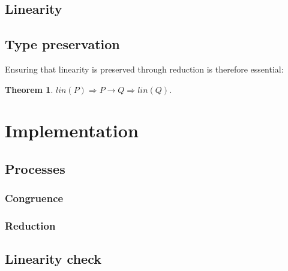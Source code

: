 \documentclass{mproj}
\newtheorem{theorem}{Theorem}
\begin{document}
\section{Linearity}\label{linearity}

\cite{Kobayashi1999}
\cite{Toninho2011}

\section{Type preservation}\label{type-preservation}

Ensuring that linearity is preserved through reduction is therefore essential:
\begin{theorem}
    $lin(P) \Rightarrow P \rightarrow Q \Rightarrow lin(Q).$
\end{theorem}

\chapter{Implementation}\label{implementation}

\section{Processes}\label{processes}
\subsection{Congruence}
\subsection{Reduction}

\section{Linearity check}\label{linearity-check}
\end{document}
